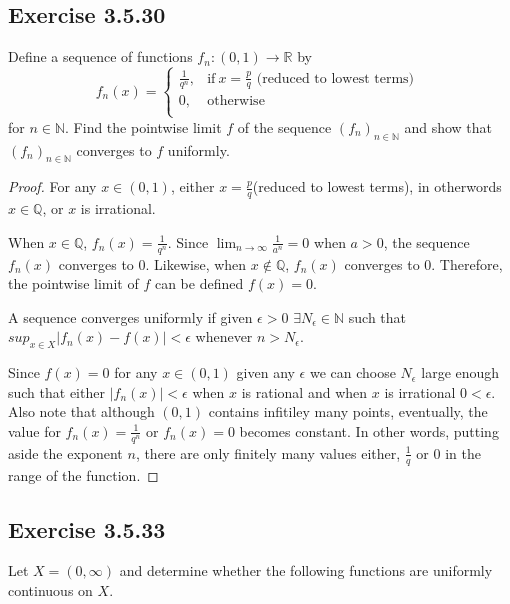 \documentclass{tufte-book}
\theoremstyle{mytheoremstyle}
\theoremstyle{mylemstyle}
\theoremstyle{mydefstyle}
\begin{document}
\subsection{Exercise 3.5.30}
Define a sequence of functions $f_n:(0,1) \to \mathbb{R}$ by
\[f_n(x) = 
\begin{cases}
      \frac{1}{q^n}, & \text{if}\ x = \frac{p}{q} \text{ (reduced to lowest terms) }\\
      0, & \text{otherwise}\\
\end{cases}
\]
for $n \in \mathbb{N}$.  Find the pointwise limit $f$ of the sequence $(f_n)_{n \in \mathbb{N}}$ and show that $(f_n)_{n \in \mathbb{N}}$ converges to $f$ uniformly.

\begin{proof}
For any $x \in (0,1)$, either $x = \frac{p}{q}$(reduced to lowest terms), in otherwords $x \in \mathbb{Q}$, or $x$ is irrational.   

When $x \in \mathbb{Q}$, $f_n(x) = \frac{1}{q^n}$.  Since $\lim_{n \to \infty}\frac{1}{a^n}=0$ when $a > 0$, the sequence $f_n(x)$ converges to $0$.   Likewise, when $x \not\in \mathbb{Q}$, $f_n(x)$ converges to $0$.  Therefore, the pointwise limit of $f$ can be defined $f(x) = 0$.

A sequence converges uniformly if given $\epsilon >0$ $\exists N_\epsilon \in \mathbb{N}$ such that $sup_{x \in X}|f_n(x) - f(x)| < \epsilon$ whenever $n > N_\epsilon$.  

Since $f(x) = 0$ for any $x \in (0,1)$ given any $\epsilon$ we can choose $N_\epsilon$ large enough such that either $|f_n(x)| < \epsilon$ when $x$ is rational and when $x$ is irrational $0 < \epsilon$.  Also note that although $(0, 1)$ contains infitiley many points, eventually, the value for $f_n(x) = \frac{1}{q^n}$ or $f_n(x) = 0$ becomes constant.  In other words, putting aside the exponent $n$, there are only finitely many values either, $\frac{1}{q}$ or ${0}$ in the range of the function.

\end{proof}
\subsection{Exercise 3.5.33}
Let $X = (0, \infty)$ and determine whether the following functions are uniformly continuous on $X$.
\end{document}
